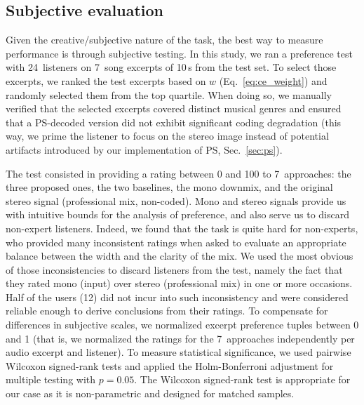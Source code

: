 \documentclass{article}
\begin{document}
\subsection{Subjective evaluation}
\label{sec:eval_subj}

Given the creative/subjective nature of the task, the best way to measure performance is through subjective testing. In this study, we ran a preference test with 24~listeners on 7~song excerpts of 10\,s from the test set. To select those excerpts, we ranked the test excerpts based on $w$ (Eq.~\ref{eq:ce_weight}) and randomly selected them from the top quartile. When doing so, 
we manually verified that the selected excerpts covered distinct musical genres and ensured that a PS-decoded version did not exhibit significant coding degradation 
(this way, we prime the listener to focus on the stereo image instead of potential artifacts introduced by our implementation of PS, Sec.~\ref{sec:ps}). 

The test consisted in providing a rating between 0 and 100 to 7~approaches: the three proposed ones, the two baselines, the mono downmix, and the original stereo signal (professional mix, non-coded). Mono and stereo signals provide us with intuitive bounds for the analysis of preference, %
and also serve us to discard non-expert listeners. Indeed, we found that the task is quite hard for non-experts, who provided many inconsistent ratings when asked to evaluate an appropriate balance between the width and the clarity of the mix. We used the most obvious of those inconsistencies to discard listeners from the test, namely the fact that they rated mono (input) over stereo (professional mix) in one or more occasions. Half of the users (12) did not incur into such inconsistency and were considered reliable enough to derive conclusions from their ratings. To compensate for differences in subjective scales, we normalized excerpt preference tuples between 0 and 1 (that is, we normalized the ratings for the 7~approaches independently per audio excerpt and listener). To measure statistical significance, we used pairwise Wilcoxon signed-rank tests and applied the Holm-Bonferroni adjustment for multiple testing with $p=0.05$. The Wilcoxon signed-rank test is appropriate for our case as it is non-parametric and designed for matched samples.
\end{document}
